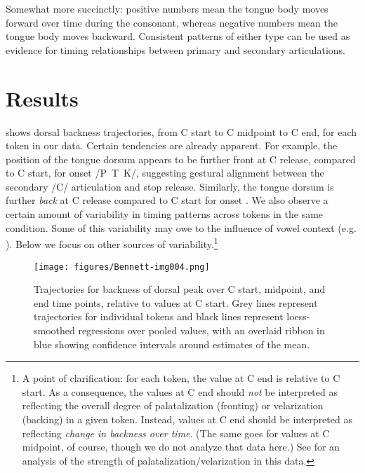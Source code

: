 \documentclass[output=paper,colorlinks,citecolor=brown]{langscibook}
\newcommand{\pal}{\ipa{ʲ}}
\begin{document}
Somewhat more succinctly: positive numbers mean the tongue body moves forward over time during the consonant, whereas negative numbers mean the tongue body moves backward. Consistent patterns of either type can be used as evidence for timing relationships between primary and secondary articulations.

\section{Results}\label{sec:results}
 shows dorsal backness trajectories, from C start to C midpoint to C end, for each token in our data. Certain tendencies are already apparent. For example, the position of the tongue dorsum appears to be further front at C release, compared to C start, for onset /P\pal\ T\pal\ K\pal/, suggesting gestural alignment between the secondary /C\pal/ articulation and stop release. Similarly, the tongue dorsum is further \emph{back} at C release compared to C start for onset . We also observe a certain amount of variability in timing patterns across tokens in the same condition. Some of this variability may owe to the influence of vowel context (e.g. \citealt{Bennett_etal2023_jphon_submission}). Below we focus on other sources of variability.\footnote{A point of clarification: for each token, the value at C end is relative to C start. As a consequence, the values at C end should \emph{not} be interpreted as reflecting the overall degree of palatalization (fronting) or velarization (backing) in a given token. Instead, values at C end should be interpreted as reflecting \emph{change in backness over time}. (The same goes for values at C midpoint, of course, though we do not analyze that data here.) See \citet{Bennett_etal2023_jphon_submission} for an analysis of the strength of palatalization/velarization in this data.}

\begin{figure}[!ht]
    \centering
    \texttt{[image: figures/Bennett-img004.png]}
    \caption{Trajectories for backness of dorsal peak over C start, midpoint, and end time points, relative to values at C start. Grey lines represent trajectories for individual tokens and black lines represent loess-smoothed regressions over pooled values, with an overlaid ribbon in blue showing confidence intervals around estimates of the mean.}
    \label{fig:trajectories}
\end{figure}
\end{document}
